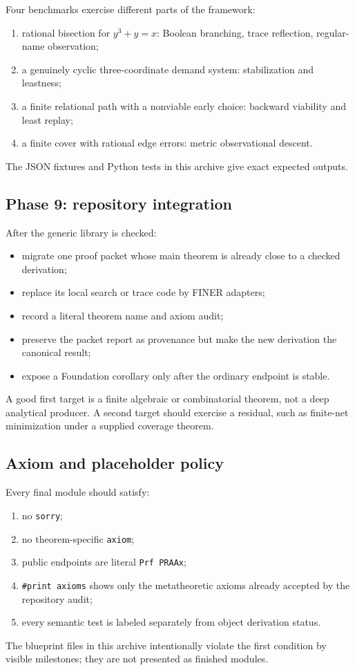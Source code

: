 Four benchmarks exercise different parts of the framework:
\begin{enumerate}[label=(\arabic*),leftmargin=2.3em]
\item rational bisection for \(y^3+y=x\): Boolean branching, trace reflection, regular-name observation;
\item a genuinely cyclic three-coordinate demand system: stabilization and leastness;
\item a finite relational path with a nonviable early choice: backward viability and least replay;
\item a finite cover with rational edge errors: metric observational descent.
\end{enumerate}
The JSON fixtures and Python tests in this archive give exact expected outputs.

\subsection{Phase 9: repository integration}

After the generic library is checked:
\begin{itemize}[leftmargin=2em]
\item migrate one proof packet whose main theorem is already close to a checked derivation;
\item replace its local search or trace code by FINER adapters;
\item record a literal theorem name and axiom audit;
\item preserve the packet report as provenance but make the new derivation the canonical result;
\item expose a Foundation corollary only after the ordinary endpoint is stable.
\end{itemize}
A good first target is a finite algebraic or combinatorial theorem, not a deep analytical producer.  A second target should exercise a residual, such as finite-net minimization under a supplied coverage theorem.

\subsection{Axiom and placeholder policy}

Every final module should satisfy:
\begin{enumerate}[label=(\roman*),leftmargin=2.3em]
\item no \texttt{sorry};
\item no theorem-specific \texttt{axiom};
\item public endpoints are literal \texttt{Prf PRAAx};
\item \texttt{\#print axioms} shows only the metatheoretic axioms already accepted by the repository audit;
\item every semantic test is labeled separately from object derivation status.
\end{enumerate}
The blueprint files in this archive intentionally violate the first condition by visible milestones; they are not presented as finished modules.

